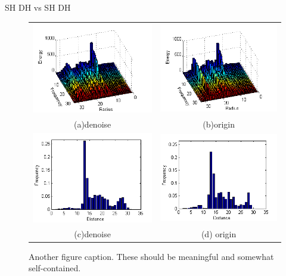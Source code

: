 \begin{enumerate}
SH  DH   vs SH DH

\begin{figure}
\begin{center}
\begin{tabular}{cc}   %
   \includegraphics[width=0.45\linewidth]{noiseinvariant_test_SH10_denoise} & 
   \includegraphics[width=0.45\linewidth]{noiseinvariant_test_SH10_origin}  \\
   (a)denoise & (b)origin                                                     \\
   \includegraphics[width=0.45\linewidth]{noiseinvariant_test_DH10_denoise} &
   \includegraphics[width=0.45\linewidth]{noiseinvariant_test_DH10_origin}  \\
   (c)denoise & (d) origin                                                    \\
\end{tabular}
\caption{Another figure caption. These should be meaningful and somewhat self-contained.} 
  \label{noiseinvarianttest_analysis}
\end{center}
\end{figure}



\end{enumerate}
